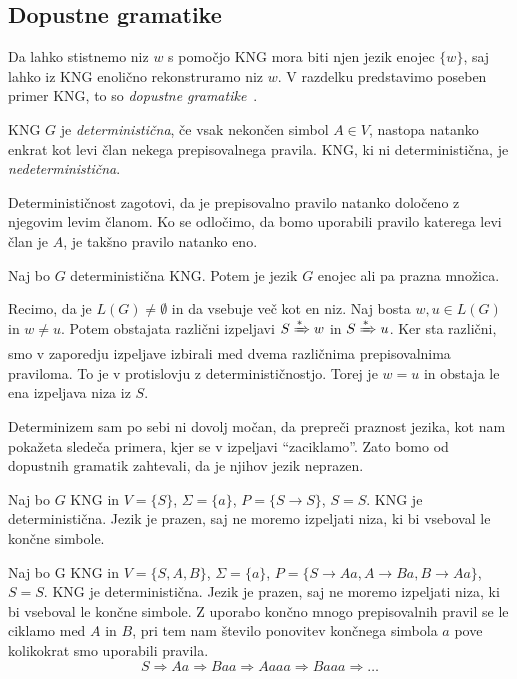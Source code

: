 \documentclass[fin1, tisk]{fmfdelo}
\theoremstyle{definition}
\begin{document}
\subsection{Dopustne gramatike}

Da lahko stistnemo niz $w$ s pomočjo KNG mora biti njen jezik enojec $\{ w \}$, saj lahko
iz KNG enolično rekonstruramo niz $w$. V razdelku predstavimo poseben primer KNG, to so
\emph{dopustne gramatike}~\cite{KiefferYang2000}.

\begin{definicija}
    KNG $G$ je \emph{deterministična}, če vsak nekončen simbol $ A \in V $, nastopa natanko enkrat
    kot levi član nekega prepisovalnega pravila. KNG, ki ni deterministična, je 
    \emph{nedeterministična}.
\end{definicija}

Determinističnost zagotovi, da je prepisovalno pravilo natanko določeno z njegovim levim članom.
Ko se odločimo, da bomo uporabili pravilo katerega levi član je $A$, je takšno pravilo natanko eno. 

\begin{trditev}\label{trditev:DetJezik}
    Naj bo $G$ deterministična KNG. Potem je jezik $G$ enojec ali pa prazna množica.
\end{trditev}

\begin{dokaz}
    Recimo, da je $L(G) \neq \emptyset$ in da vsebuje več kot en niz. Naj bosta $w, u \in L(G)$
    in $w \neq u$. Potem obstajata različni izpeljavi $S \xRightarrow{*} w$ in 
    $S \xRightarrow{*} u$. Ker sta različni, smo v zaporedju izpeljave izbirali med dvema 
    različnima prepisovalnima praviloma. To je v protislovju z determinističnostjo. Torej je 
    $w = u$ in obstaja le ena izpeljava niza iz $S$.
\end{dokaz}

Determinizem sam po sebi ni dovolj močan, da prepreči praznost jezika, kot nam pokažeta sledeča
primera, kjer se v izpeljavi ``zaciklamo''. Zato bomo od dopustnih gramatik zahtevali, da je 
njihov jezik neprazen.

\begin{primer}
    Naj bo $G$ KNG in $V = \{ S \}$, $\Sigma = \{ a \}$, $P = \{ S \rightarrow S \}$, $S = S$.
    KNG je deterministična. Jezik je prazen, saj ne moremo izpeljati niza, ki bi vseboval le
    končne simbole.
\end{primer}

\begin{primer}
    Naj bo G KNG in $V = \{ S, A, B \} $, $\Sigma = \{ a \}$, 
    $P = \{ S \rightarrow \mathit{Aa}, A \rightarrow \mathit{Ba}, B \rightarrow Aa \}$, $S = S$. 
    KNG je deterministična. Jezik je prazen, saj ne moremo izpeljati niza, ki bi vseboval le 
    končne simbole. Z uporabo končno mnogo prepisovalnih pravil se le ciklamo med $A$ in $B$, 
    pri tem nam število ponovitev končnega simbola $a$ pove kolikokrat smo uporabili pravila.
    \[
        S \Rightarrow \mathit{Aa} \Rightarrow \mathit{Baa} \Rightarrow \mathit{Aaaa} \Rightarrow
        \mathit{Baaa} \Rightarrow\ldots
    \]
\end{primer}
\end{document}
